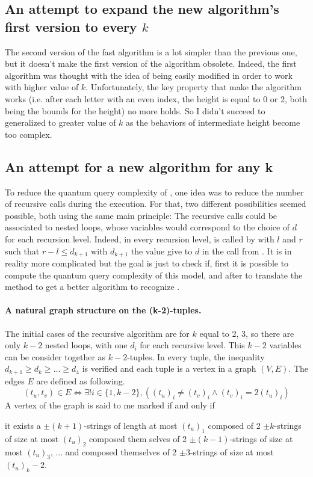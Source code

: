 \subsection{An attempt to expand the new
    algorithm's first version to every $k$}

The second version of the fast algorithm is a lot simpler than the
previous one, but it doesn't make the first version of the algorithm
obsolete. Indeed, the first algorithm was thought with the idea of being
easily modified in order to work with higher value of $k$. Unfortunately,
the key property that make the algorithm works (i.e. after each letter with
an even index, the height is equal to 0 or 2, both being the bounds for the
height) no more holds. So I didn't succeed to generalized to greater value
of $k$ as the behaviors of intermediate height become too complex.

\subsection{An attempt for a new algorithm for any k}
\label{subsec:dicho}

To reduce the quantum query complexity of , one idea was
to reduce the number of recursive calls during the execution. For that,
two different possibilities seemed possible, both using the same
main principle: The recursive calls could be associated to nested loops,
whose variables would correspond to the choice of $d$ for each recursion level.
Indeed, in every recursion level,  is called by  with $l$ and $r$
such that $r-l\leq d_{k+1}$ with $d_{k+1}$ the value give to $d$ in the call
from . It is in reality more complicated but the goal is just to
check if, first it is possible to compute the quantum query complexity
of this model, and after to translate the method to get a better algorithm to
recognize .

\paragraph*{A natural graph structure on the (k-2)-tuples.} The initial
cases of the recursive algorithm are for $k$ equal to 2, 3, so there
are only $k-2$ nested loops, with one $d_i$ for each recursive level.
This $k-2$ variables can be consider together as $k-2$-tuples. In every
tuple, the inequality $ d_{k+1} \geq d_k \geq \ldots \geq d_4$ is verified
and each tuple is a vertex in a graph $(V,E)$. The edges $E$ are defined as
following.
\[ (t_u,t_v) \in E \Leftrightarrow \exists ! i \in \{1, k-2\}, \left( (t_u)_i
    \neq (t_v)_i \land (t_v)_i = 2(t_u)_i\right)\]
A vertex of the graph is said to me marked if and only if
\begin{center}
    \begin{minipage}{.8\textwidth}
        it exists a $\pm (k+1)$-strings
        of length at most $(t_u)_1$ composed of 2 $\pm k$-strings of size at most
        $(t_u)_2$ composed them selves of 2 $\pm (k-1)$-strings of size at most
        $(t_u)_3$, ... and composed themselves of  2 $\pm 3$-strings of size at most
        $(t_u)_k-2$.
    \end{minipage}
\end{center}

